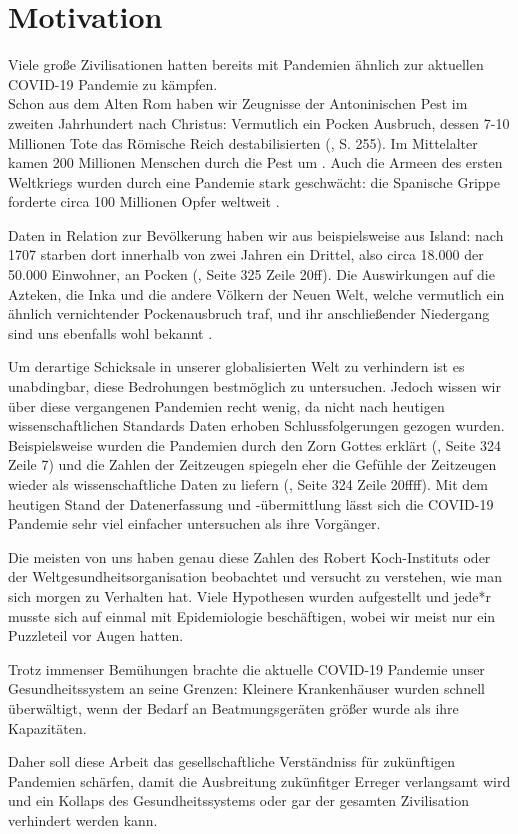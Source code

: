 \chapter{Motivation}\label{chap:Motivation}
Viele große Zivilisationen hatten bereits mit Pandemien ähnlich zur aktuellen COVID-19 Pandemie zu kämpfen.\\
Schon aus dem Alten Rom haben wir Zeugnisse der Antoninischen Pest im zweiten Jahrhundert nach Christus: Vermutlich ein Pocken Ausbruch, dessen 7-10 Millionen Tote das Römische Reich destabilisierten (\autocite{RomPest}, S. 255).
Im Mittelalter kamen 200 Millionen Menschen durch die Pest um \autocite{PestMittelalter}.
Auch die Armeen des ersten Weltkriegs wurden durch eine Pandemie stark geschwächt: die Spanische Grippe forderte circa 100 Millionen Opfer weltweit \autocite{SpanischeGrippe}.

Daten in Relation zur Bevölkerung haben wir aus beispielsweise aus Island: nach 1707 starben dort innerhalb von zwei Jahren ein Drittel, also circa  18.000 der 50.000 Einwohner, an Pocken (\autocite{americaPandemics}, Seite 325 Zeile 20ff). Die Auswirkungen auf die Azteken, die Inka und die andere Völkern der Neuen Welt, welche vermutlich ein ähnlich vernichtender Pockenausbruch traf, und ihr anschließender Niedergang sind uns ebenfalls wohl bekannt \autocite{americaPandemics}.

Um derartige Schicksale in unserer globalisierten Welt zu verhindern ist es unabdingbar, diese Bedrohungen bestmöglich zu untersuchen.
Jedoch wissen wir über diese vergangenen Pandemien recht wenig, da nicht nach heutigen wissenschaftlichen Standards Daten erhoben Schlussfolgerungen gezogen wurden. Beispielsweise wurden die Pandemien durch den Zorn Gottes erklärt (\autocite{americaPandemics}, Seite 324 Zeile 7) und die Zahlen der Zeitzeugen spiegeln eher die Gefühle der Zeitzeugen wieder als wissenschaftliche Daten zu liefern (\autocite{americaPandemics}, Seite 324 Zeile 20ffff). Mit dem heutigen Stand der Datenerfassung und -übermittlung lässt sich die COVID-19 Pandemie sehr viel einfacher untersuchen als ihre Vorgänger.

Die meisten von uns haben genau diese Zahlen des Robert Koch-Instituts oder der Weltgesundheitsorganisation beobachtet und versucht zu verstehen, wie man sich morgen zu Verhalten hat. Viele Hypothesen wurden aufgestellt und jede*r musste sich auf einmal mit Epidemiologie beschäftigen, wobei wir meist nur ein Puzzleteil vor Augen hatten.

Trotz immenser Bemühungen brachte die aktuelle COVID-19 Pandemie unser Gesundheitssystem an seine Grenzen: Kleinere Krankenhäuser wurden schnell überwältigt, wenn der Bedarf an Beatmungsgeräten größer wurde als ihre Kapazitäten.

Daher soll diese Arbeit das gesellschaftliche Verständniss für zukünftigen Pandemien schärfen, damit die Ausbreitung zukünfitger Erreger verlangsamt wird und ein Kollaps des Gesundheitssystems oder gar der gesamten Zivilisation verhindert werden kann.
